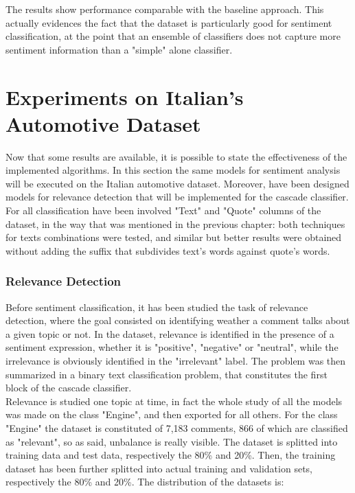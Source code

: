 The results show performance comparable with the baseline approach. This actually evidences the fact that the dataset is particularly good for sentiment classification, at the point that an ensemble of classifiers does not capture more sentiment information than a "simple" alone classifier.






\section{Experiments on Italian's Automotive Dataset}

Now that some results are available, it is possible to state the effectiveness of the implemented algorithms. In this section the same models for sentiment analysis will be executed on the Italian automotive dataset. Moreover, have been designed models for relevance detection that will be implemented for the cascade classifier. For all classification have been involved "Text" and "Quote" columns of the dataset, in the way that was mentioned in the previous chapter: both techniques for texts combinations were tested, and similar but better results were obtained without adding the suffix that subdivides text's words against quote's words. \\

\subsubsection{Relevance Detection}

Before sentiment classification, it has been studied the task of relevance detection, where the goal consisted on identifying weather a comment talks about a given topic or not. In the dataset, relevance is identified in the presence of a sentiment expression, whether it is "positive", "negative" or "neutral", while the irrelevance is obviously identified in the "irrelevant" label. The problem was then summarized in a binary text classification problem, that constitutes the first block of the cascade classifier.\\
Relevance is studied one topic at time, in fact the whole study of all the models was made on the class "Engine", and then exported for all others. For the class "Engine" the dataset is constituted of 7,183 comments, 866 of which are classified as "relevant", so as said, unbalance is really visible. The dataset is splitted into training data and test data, respectively the 80\% and 20\%. Then, the training dataset has been further splitted into actual training and validation sets, respectively the 80\% and 20\%. The distribution of the datasets is:

